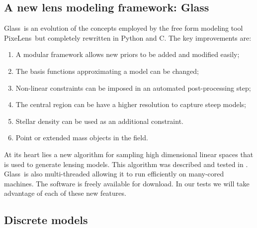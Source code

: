 \documentclass[onecolumn,galley]{mn2e}
\newcommand{\Glass}{{\sc Glass}}
\newcommand{\PixeLens}{{\sc PixeLens}}
\begin{document}
\subsection{A new lens modeling framework: \Glass}

\Glass\ is an evolution of the concepts employed by the free form modeling tool
\PixeLens\ but completely rewritten in Python and C. The key improvements are:
\begin{enumerate}
  \item A modular framework allows new priors to be added and modified easily;
  \item The basis functions approximating a model can be changed; 
  \item Non-linear constraints can be imposed in an automated post-processing step; 
  \item The central region can be have a higher resolution to capture steep models; 
  \item Stellar density can be used as an additional constraint.  
  \item Point or extended mass objects in the field.
\end{enumerate}
At its heart lies a new algorithm for sampling high dimensional linear spaces
that is used to generate lensing models. This algorithm was described and
tested in \cite{}. \Glass\ is also multi-threaded allowing it to run
efficiently on many-cored machines.  The software is freely available for
download. In our tests we will take advantage of each of these new features.

\subsection{Discrete models}
\end{document}
